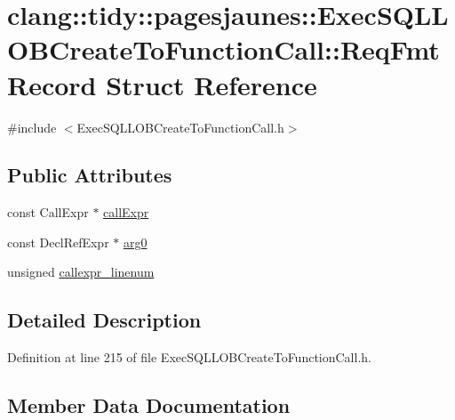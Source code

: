 \hypertarget{structclang_1_1tidy_1_1pagesjaunes_1_1_exec_s_q_l_l_o_b_create_to_function_call_1_1_req_fmt_record}{}\section{clang\+:\+:tidy\+:\+:pagesjaunes\+:\+:Exec\+S\+Q\+L\+L\+O\+B\+Create\+To\+Function\+Call\+:\+:Req\+Fmt\+Record Struct Reference}
\label{structclang_1_1tidy_1_1pagesjaunes_1_1_exec_s_q_l_l_o_b_create_to_function_call_1_1_req_fmt_record}


{\ttfamily \#include $<$Exec\+S\+Q\+L\+L\+O\+B\+Create\+To\+Function\+Call.\+h$>$}

\subsection*{Public Attributes}
\begin{DoxyCompactItemize}
\item 
const Call\+Expr $\ast$ \hyperlink{structclang_1_1tidy_1_1pagesjaunes_1_1_exec_s_q_l_l_o_b_create_to_function_call_1_1_req_fmt_record_ab932d6540f89af6efb334b2bc7e81b70}{call\+Expr}
\item 
const Decl\+Ref\+Expr $\ast$ \hyperlink{structclang_1_1tidy_1_1pagesjaunes_1_1_exec_s_q_l_l_o_b_create_to_function_call_1_1_req_fmt_record_ac4d88b88085778a62e816ccb71ac0455}{arg0}
\item 
unsigned \hyperlink{structclang_1_1tidy_1_1pagesjaunes_1_1_exec_s_q_l_l_o_b_create_to_function_call_1_1_req_fmt_record_ad11ae828ae15c406acc291329b85e9ed}{callexpr\+\_\+linenum}
\end{DoxyCompactItemize}


\subsection{Detailed Description}


Definition at line 215 of file Exec\+S\+Q\+L\+L\+O\+B\+Create\+To\+Function\+Call.\+h.



\subsection{Member Data Documentation}
\mbox{\label{structclang_1_1tidy_1_1pagesjaunes_1_1_exec_s_q_l_l_o_b_create_to_function_call_1_1_req_fmt_record_ac4d88b88085778a62e816ccb71ac0455}} 
